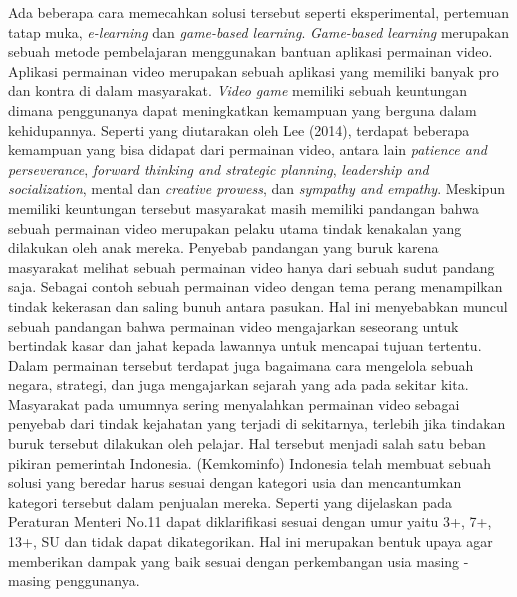 \linebreak\linebreak
Ada beberapa cara memecahkan solusi tersebut seperti eksperimental, pertemuan tatap muka, \textit{e-learning} dan \textit{game-based learning}. \textit{Game-based learning} merupakan sebuah metode pembelajaran menggunakan bantuan aplikasi permainan video. Aplikasi permainan video merupakan sebuah aplikasi yang memiliki banyak pro dan kontra di dalam masyarakat. \textit{Video game} memiliki sebuah keuntungan dimana penggunanya dapat meningkatkan kemampuan yang berguna dalam kehidupannya. Seperti yang diutarakan oleh Lee (2014), terdapat beberapa kemampuan yang bisa didapat dari permainan video, antara lain \textit{patience and perseverance}, \textit{forward thinking and strategic planning}, \textit{leadership and socialization}, mental dan \textit{creative prowess}, dan \textit{sympathy and empathy}. Meskipun memiliki keuntungan tersebut masyarakat masih memiliki pandangan bahwa sebuah permainan video merupakan pelaku utama tindak kenakalan yang dilakukan oleh anak mereka.
\linebreak\linebreak
Penyebab pandangan yang buruk karena masyarakat melihat sebuah permainan video hanya dari sebuah sudut pandang saja. Sebagai contoh sebuah permainan video dengan tema perang menampilkan tindak kekerasan dan saling bunuh antara pasukan. Hal ini menyebabkan muncul sebuah pandangan bahwa permainan video mengajarkan seseorang untuk bertindak kasar dan jahat kepada lawannya untuk mencapai tujuan tertentu. Dalam permainan tersebut terdapat juga bagaimana cara mengelola sebuah negara, strategi, dan juga mengajarkan sejarah yang ada pada sekitar kita. Masyarakat pada umumnya sering menyalahkan permainan video sebagai penyebab dari tindak kejahatan yang terjadi di sekitarnya, terlebih jika tindakan buruk tersebut dilakukan oleh pelajar.
\linebreak\linebreak
Hal tersebut menjadi salah satu beban pikiran pemerintah Indonesia. \kemkominfo (Kemkominfo) Indonesia telah membuat sebuah solusi \game yang beredar harus sesuai dengan kategori usia dan mencantumkan kategori tersebut dalam penjualan \game mereka. Seperti yang dijelaskan pada Peraturan Menteri No.11 \game dapat diklarifikasi sesuai dengan umur yaitu 3+, 7+, 13+, SU dan tidak dapat dikategorikan. Hal ini merupakan bentuk upaya agar \game memberikan dampak yang baik sesuai dengan perkembangan usia masing - masing penggunanya.
\linebreak\linebreak
